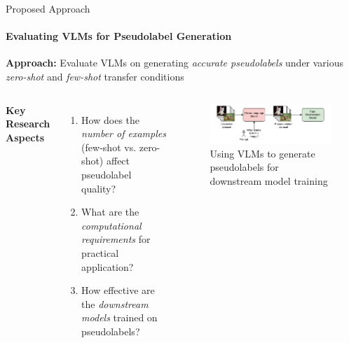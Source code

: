 \documentclass[aspectratio=169]{beamer}
\begin{document}
\begin{frame}{Proposed Approach}
\framesubtitle{Evaluating VLMs for Pseudolabel Generation}
  \textbf{Approach:} Evaluate VLMs on generating \emph{accurate pseudolabels} under various \emph{zero-shot} and \emph{few-shot} transfer conditions
  \vspace{0.3em}
    
  \begin{columns}[T]
      \centering \textbf{Key Research Aspects}
      \begin{enumerate}
        \item How does the \emph{number of examples} (few-shot vs. zero-shot) affect pseudolabel quality?
        \item What are the \emph{computational requirements} for practical application?
        \item How effective are the \emph{downstream models} trained on pseudolabels?
      \end{enumerate}

    \begin{figure}
      \includegraphics[width=\textwidth]{figures/vlm_transfer_downstream.pdf}
      \caption{\centering Using VLMs to generate pseudolabels for downstream model training}
    \end{figure}
  \end{columns}
\end{frame}
\end{document}
